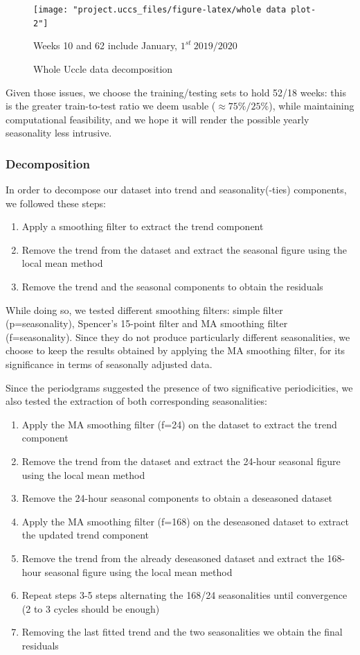 \documentclass[12pt]{article}
\begin{document}
\begin{figure}[h]
	\centering
	\texttt{[image: "project.uccs\_files/figure-latex/whole data plot-2"]}
	\caption{Whole Uccle data decomposition}{\footnotesize Weeks 10 and 62 include January, $1^{st}~2019/2020$}
	\label{fig:whole-data-decomposition}
\end{figure}

Given those issues, we choose the training/testing sets to hold 52/18 weeks: this is the greater train-to-test ratio we deem usable ($\approx 75\%/25\%$), while maintaining computational feasibility, and we hope it will render the possible yearly seasonality less intrusive.


\subsubsection{Decomposition}
In order to decompose our dataset into trend and seasonality(-ties) components, we followed these steps:
\begin{enumerate}
	\item Apply a smoothing filter to extract the trend component
	\item Remove the trend from the dataset and extract the seasonal figure using the local mean method
	\item Remove the trend and the seasonal components to obtain the residuals
\end{enumerate}
While doing so, we tested different smoothing filters: simple filter (p=seasonality), Spencer's 15-point filter and MA smoothing filter (f=seasonality). Since they do not produce particularly different seasonalities, we choose to keep the results obtained by applying the MA smoothing filter, for its significance in terms of seasonally adjusted data.

Since the periodgrams suggested the presence of two significative periodicities, we also tested the extraction of both corresponding seasonalities:
\begin{enumerate}
	\item Apply the MA smoothing filter (f=24) on the dataset to extract the trend component
	\item Remove the trend from the dataset and extract the 24-hour seasonal figure using the local mean method
	\item Remove the 24-hour seasonal components to obtain a deseasoned dataset
	\item Apply the MA smoothing filter (f=168) on the deseasoned dataset to extract the updated trend component
	\item Remove the trend from the already deseasoned dataset and extract the 168-hour seasonal figure using the local mean method
	\item Repeat steps 3-5 steps alternating the 168/24 seasonalities until convergence (2 to 3 cycles should be enough)
	\item Removing the last fitted trend and the two seasonalities we obtain the final residuals
\end{enumerate}
\end{document}
